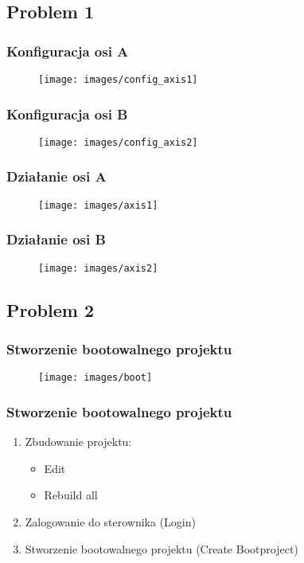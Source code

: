\documentclass[ucs]{beamer}
\begin{document}
\subsection{Problem 1}
\begin{frame}
\frametitle{Konfiguracja osi A}
\begin{figure}[!htb]	
\centering 	          
\texttt{[image: images/config\_axis1]}
\end{figure}
\end{frame}

\begin{frame}
\frametitle{Konfiguracja osi B}
\begin{figure}[!htb]	
\centering 	          
\texttt{[image: images/config\_axis2]}
\end{figure}
\end{frame}

\begin{frame}
\frametitle{Działanie osi A}
\begin{figure}[!htb]	
\centering 	          
\texttt{[image: images/axis1]}
\end{figure}
\end{frame}

\begin{frame}
\frametitle{Działanie osi B}
\begin{figure}[!htb]	
\centering 	          
\texttt{[image: images/axis2]}
\end{figure}
\end{frame}

\subsection{Problem 2}
\begin{frame}
\frametitle{Stworzenie bootowalnego projektu}
\begin{figure}[!htb]	
\centering 	          
\texttt{[image: images/boot]}
\end{figure}
\end{frame}

\begin{frame}
\frametitle{Stworzenie bootowalnego projektu}
\begin{enumerate}
    \item Zbudowanie projektu:
    \begin{itemize}
		\item Edit
		\item Rebuild all
	\end{itemize}
    \item Zalogowanie do sterownika (Login)
    \item Stworzenie bootowalnego projektu (Create Bootproject)
    
\end{enumerate}
\end{frame}
\end{document}
